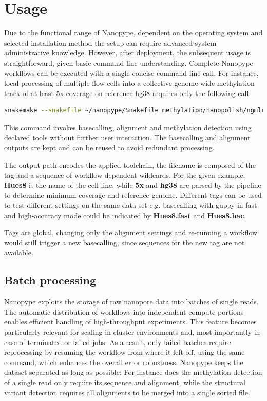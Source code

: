 \section{Usage}
\label{sec:nanopype:usage}
Due to the functional range of Nanopype, dependent on the operating system and selected installation method the setup can require advanced system administrative knowledge. However, after deployment, the subsequent usage is straightforward, given basic command line understanding. Complete Nanopype workflows can be executed with a single concise command line call. For instance, local processing of multiple flow cells into a collective genome-wide methylation track of at least 5x coverage on reference hg38 requires only the following call:

\begin{lstlisting}[language=sh, caption=Snakemake example]
snakemake --snakefile ~/nanopype/Snakefile methylation/nanopolish/ngmlr/guppy/Hues8.5x.hg38.bw
\end{lstlisting}

This command invokes basecalling, alignment and methylation detection using declared tools without further user interaction. The basecalling and alignment outputs are kept and can be reused to avoid redundant processing.

The output path encodes the applied toolchain, the filename is composed of the tag and a sequence of workflow dependent wildcards. For the given example, \textbf{Hues8} is the name of the cell line, while \textbf{5x} and \textbf{hg38} are parsed by the pipeline to determine minimum coverage and reference genome. Different tags can be used to test different settings on the same data set e.g. basecalling with guppy in fast and high-accuracy mode could be indicated by \textbf{Hues8.fast} and \textbf{Hues8.hac}.

Tags are global, changing only the alignment settings and re-running a workflow would still trigger a new basecalling, since sequences for the new tag are not available. 


\subsection{Batch processing}
\label{subsec:nanopype:batchprocessing}
Nanopype exploits the storage of raw nanopore data into batches of single reads. The automatic distribution of workflows into independent compute portions enables efficient handling of high-throughput experiments. This feature becomes particularly relevant for scaling in cluster environments and, most importantly in case of terminated or failed jobs. As a result, only failed batches require reprocessing by resuming the workflow from where it left off, using the same command, which enhances the overall error robustness. 
Nanopype keeps the dataset separated as long as possible: For instance does the methylation detection of a single read only require its sequence and alignment, while the structural variant detection requires all alignments to be merged into a single sorted file.

